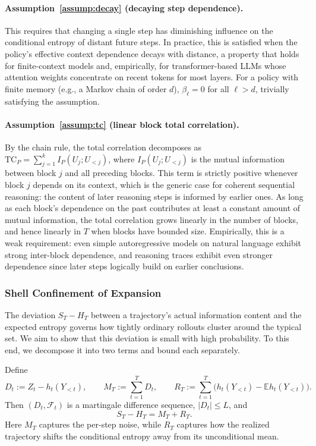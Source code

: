 \documentclass{llmxive}
\begin{document}
\paragraph{Assumption~\ref{assump:decay} (decaying step dependence).} This requires that changing a single step has diminishing influence on the conditional entropy of distant future steps. In practice, this is satisfied when the policy's effective context dependence decays with distance, a property that holds for finite-context models and, empirically, for transformer-based LLMs whose attention weights concentrate on recent tokens for most layers. For a policy with finite memory (e.g., a Markov chain of order $d$), $\beta_\ell = 0$ for all $\ell > d$, trivially satisfying the assumption.

\paragraph{Assumption~\ref{assump:tc} (linear block total correlation).} By the chain rule, the total correlation decomposes as $\mathrm{TC}_P = \sum_{j=1}^k I_P(U_j; U_{<j})$, where $I_P(U_j; U_{<j})$ is the mutual information between block $j$ and all preceding blocks. This term is strictly positive whenever block $j$ depends on its context, which is the generic case for coherent sequential reasoning: the content of later reasoning steps is informed by earlier ones. As long as each block's dependence on the past contributes at least a constant amount of mutual information, the total correlation grows linearly in the number of blocks, and hence linearly in $T$ when blocks have bounded size. Empirically, this is a weak requirement: even simple autoregressive models on natural language exhibit strong inter-block dependence, and reasoning traces exhibit even stronger dependence since later steps logically build on earlier conclusions.

\subsubsection{Shell Confinement of Expansion}

The deviation $S_T - H_T$ between a trajectory's actual information content and the expected entropy governs how tightly ordinary rollouts cluster around the typical set. We aim to show that this deviation is small with high probability. To this end, we decompose it into two terms and bound each separately.

\begin{lemma}
\label{lem:decomp}
Define
\begin{equation}
  D_t:=Z_t-h_t(Y_{<t}),
  \qquad
  M_T:=\sum_{t=1}^{T}D_t,
  \qquad
  R_T:=\sum_{t=1}^{T}\big(h_t(Y_{<t})-\mathbb{E}h_t(Y_{<t})\big).
\end{equation}
Then $(D_t,\mathcal{F}_t)$ is a martingale difference sequence, $|D_t|\le L$, and
\begin{equation}
  S_T-H_T=M_T+R_T.
  \label{eq:martingale-decomp}
\end{equation}
Here $M_T$ captures the per-step noise, while $R_T$ captures how the realized trajectory shifts the conditional entropy away from its unconditional mean.
\end{lemma}
\end{document}

